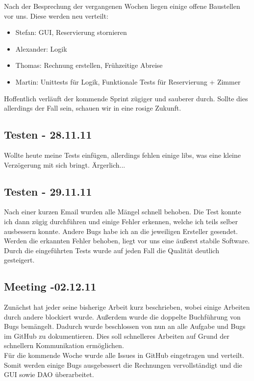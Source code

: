 \documentclass[11pt]{scrartcl}
\begin{document}
Nach der Besprechung der vergangenen Wochen liegen einige offene Baustellen vor uns. Diese werden neu verteilt:
\begin{itemize}
\item Stefan: GUI, Reservierung stornieren
\item Alexander: Logik
\item Thomas: Rechnung erstellen, Frühzeitige Abreise
\item Martin: Unittests für Logik, Funktionale Tests für Reservierung + Zimmer
\end{itemize}

Hoffentlich verläuft der kommende Sprint zügiger und sauberer durch. Sollte dies allerdings der Fall sein, schauen wir in eine rosige Zukunft.

\subsection{Testen - 28.11.11}

Wollte heute meine Tests einfügen, allerdings fehlen einige libs, was eine kleine Verzögerung mit sich bringt. Ärgerlich...

\subsection{Testen - 29.11.11}

Nach einer kurzen Email wurden alle Mängel schnell behoben. Die Test konnte ich dann zügig durchführen und einige Fehler erkennen, welche ich teils selber ausbessern konnte. Andere Bugs habe ich an die jeweiligen Ersteller gesendet. \\
Werden die erkannten Fehler behoben, liegt vor uns eine äußerst stabile Software. Durch die eingeführten Tests wurde auf jeden Fall die Qualität deutlich gesteigert.

\subsection{Meeting -02.12.11}

Zunächst hat jeder seine bisherige Arbeit kurz beschrieben, wobei einige Arbeiten durch andere blockiert wurde. Außerdem wurde die doppelte Buchführung von Bugs bemängelt.
Dadurch wurde beschlossen von nun an alle Aufgabe und Bugs im GitHub zu dokumentieren.
Dies soll schnelleres Arbeiten auf Grund der schnellern Kommunikation ermöglichen. \\
Für die kommende Woche wurde alle Issues in GitHub eingetragen und verteilt. Somit werden einige Bugs ausgebessert die Rechnungen vervollständigt und die GUI sowie DAO überarbeitet.
\end{document}

